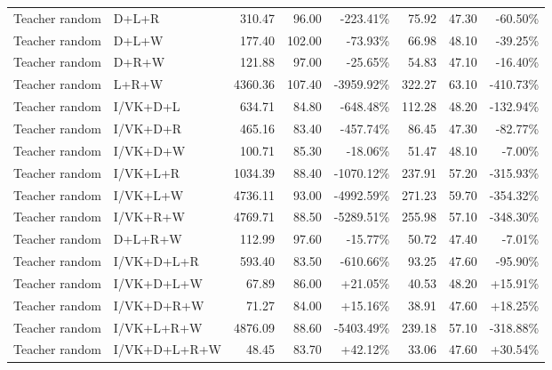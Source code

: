 \documentclass[UTF8,10pt]{ctexart}
\newcommand{\better}[1]{\textcolor{goodblue}{#1}}
\newcommand{\worse}[1]{\textcolor{badred}{#1}}
\begin{document}
{\begin{longtable}{llrrrrrr}
Teacher random & D+L+R & 310.47 & 96.00 & \worse{-223.41\%} & 75.92 & 47.30 & \worse{-60.50\%}\\
Teacher random & D+L+W & 177.40 & 102.00 & \worse{-73.93\%} & 66.98 & 48.10 & \worse{-39.25\%}\\
Teacher random & D+R+W & 121.88 & 97.00 & \worse{-25.65\%} & 54.83 & 47.10 & \worse{-16.40\%}\\
Teacher random & L+R+W & 4360.36 & 107.40 & \worse{-3959.92\%} & 322.27 & 63.10 & \worse{-410.73\%}\\
Teacher random & I/VK+D+L & 634.71 & 84.80 & \worse{-648.48\%} & 112.28 & 48.20 & \worse{-132.94\%}\\
Teacher random & I/VK+D+R & 465.16 & 83.40 & \worse{-457.74\%} & 86.45 & 47.30 & \worse{-82.77\%}\\
Teacher random & I/VK+D+W & 100.71 & 85.30 & \worse{-18.06\%} & 51.47 & 48.10 & \worse{-7.00\%}\\
Teacher random & I/VK+L+R & 1034.39 & 88.40 & \worse{-1070.12\%} & 237.91 & 57.20 & \worse{-315.93\%}\\
Teacher random & I/VK+L+W & 4736.11 & 93.00 & \worse{-4992.59\%} & 271.23 & 59.70 & \worse{-354.32\%}\\
Teacher random & I/VK+R+W & 4769.71 & 88.50 & \worse{-5289.51\%} & 255.98 & 57.10 & \worse{-348.30\%}\\
Teacher random & D+L+R+W & 112.99 & 97.60 & \worse{-15.77\%} & 50.72 & 47.40 & \worse{-7.01\%}\\
Teacher random & I/VK+D+L+R & 593.40 & 83.50 & \worse{-610.66\%} & 93.25 & 47.60 & \worse{-95.90\%}\\
Teacher random & I/VK+D+L+W & 67.89 & 86.00 & \better{+21.05\%} & 40.53 & 48.20 & \better{+15.91\%}\\
Teacher random & I/VK+D+R+W & 71.27 & 84.00 & \better{+15.16\%} & 38.91 & 47.60 & \better{+18.25\%}\\
Teacher random & I/VK+L+R+W & 4876.09 & 88.60 & \worse{-5403.49\%} & 239.18 & 57.10 & \worse{-318.88\%}\\
Teacher random & I/VK+D+L+R+W & 48.45 & 83.70 & \better{+42.12\%} & 33.06 & 47.60 & \better{+30.54\%}\\


\end{longtable}}
\end{document}
